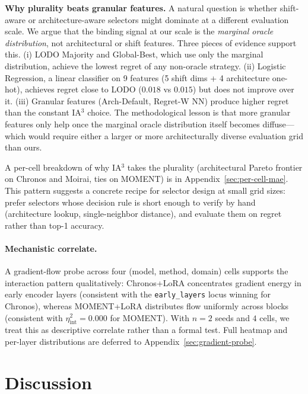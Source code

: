 \documentclass{article}
\begin{document}
\textbf{Why plurality beats granular features.} A natural question is whether shift-aware or architecture-aware selectors might dominate at a different evaluation scale. We argue that the binding signal at our scale is the \emph{marginal oracle distribution}, not architectural or shift features. Three pieces of evidence support this. (i) LODO Majority and Global-Best, which use only the marginal distribution, achieve the lowest regret of any non-oracle strategy. (ii) Logistic Regression, a linear classifier on 9 features (5 shift dims + 4 architecture one-hot), achieves regret close to LODO ($0.018$ vs $0.015$) but does not improve over it. (iii) Granular features (Arch-Default, Regret-W NN) produce higher regret than the constant IA$^3$ choice. The methodological lesson is that more granular features only help once the marginal oracle distribution itself becomes diffuse---which would require either a larger or more architecturally diverse evaluation grid than ours.

A per-cell breakdown of why IA$^3$ takes the plurality (architectural Pareto frontier on Chronos and Moirai, ties on MOMENT) is in Appendix~\ref{sec:per-cell-mae}. This pattern suggests a concrete recipe for selector design at small grid sizes: prefer selectors whose decision rule is short enough to verify by hand (architecture lookup, single-neighbor distance), and evaluate them on regret rather than top-1 accuracy.

\paragraph{Mechanistic correlate.}
A gradient-flow probe across four (model, method, domain) cells supports the interaction pattern qualitatively: Chronos+LoRA concentrates gradient energy in early encoder layers (consistent with the \texttt{early\_layers} locus winning for Chronos), whereas MOMENT+LoRA distributes flow uniformly across blocks (consistent with $\eta^2_{\text{int}} = 0.000$ for MOMENT). With $n{=}2$ seeds and $4$ cells, we treat this as descriptive correlate rather than a formal test. Full heatmap and per-layer distributions are deferred to Appendix~\ref{sec:gradient-probe}.

\section{Discussion}
\end{document}
